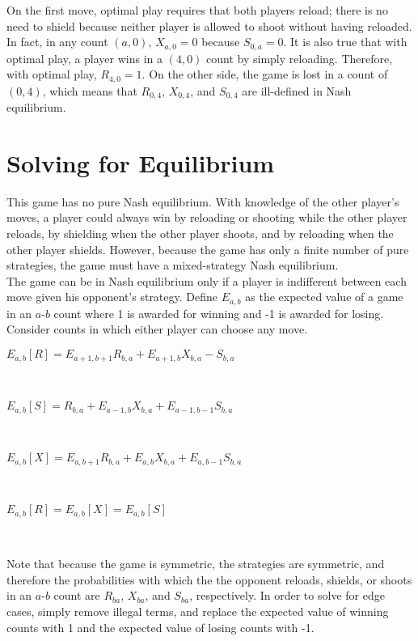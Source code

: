 \documentclass[11pt]{article}
\begin{document}
\begin{multicols}{2}
On the first move, optimal play requires that both players reload; there is no need to shield because neither player is allowed to shoot without having reloaded. In fact, in any count $(a, 0)$, $X_{a,0} = 0$ because $S_{0,a} = 0$. It is also true that with optimal play, a player wins in a $(4, 0)$ count by simply reloading. Therefore, with optimal play, $R_{4,0} = 1$. On the other side, the game is lost in a count of $(0, 4)$, which means that $R_{0,4}$, $X_{0,4}$, and $S_{0,4}$ are ill-defined in Nash equilibrium.

\section{Solving for Equilibrium}

This game has no pure Nash equilibrium. With knowledge of the other player's moves, a player could always win by reloading or shooting while the other player reloads, by shielding when the other player shoots, and by reloading when the other player shields. However, because the game has only a finite number of pure strategies, the game must have a mixed-strategy Nash equilibrium.
\\

The game can be in Nash equilibrium only if a player is indifferent between each move given his opponent's strategy. Define $E_{a,b}$ as the expected value of a game in an $a$-$b$ count where 1 is awarded for winning and -1 is awarded for losing. Consider counts in which either player can choose any move.
\\

\begin{center}

$E_{a,b}[R] = E_{a+1,b+1}R_{b,a} + E_{a+1,b}X_{b,a} - S_{b,a}$

\

$E_{a,b}[S] = R_{b,a} + E_{a-1,b}X_{b,a} + E_{a-1,b-1}S_{b,a}$

\

$E_{a,b}[X] = E_{a,b+1}R_{b,a} + E_{a,b}X_{b,a} + E_{a,b-1}S_{b,a}$

\

$E_{a,b}[R] = E_{a,b}[X] = E_{a,b}[S]$

\

\end{center}

Note that because the game is symmetric, the strategies are symmetric, and therefore the probabilities with which the the opponent reloads, shields, or shoots in an $a$-$b$ count are $R_{ba}$, $X_{ba}$, and $S_{ba}$, respectively. In order to solve for edge cases, simply remove illegal terms, and replace the expected value of winning counts with 1 and the expected value of losing counts with -1.
\\


\end{multicols}
\end{document}
